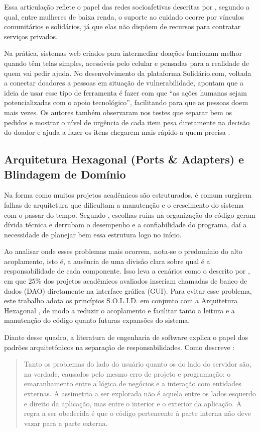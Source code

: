 Essa articulação reflete o papel das redes socioafetivas descritas por \textcite[22]{sousa2025}, segundo a qual, entre mulheres de baixa renda, o suporte ao cuidado ocorre por vínculos comunitários e solidários, já que elas não dispõem de recursos para contratar serviços privados.

Na prática, sistemas web criados para intermediar doações funcionam melhor quando têm telas simples, acessíveis pelo celular e pensadas para a realidade de quem vai pedir ajuda. No desenvolvimento da plataforma Solidário.com, voltada a conectar doadores a pessoas em situação de vulnerabilidade, \textcite[178]{santos2026} apontam que a ideia de usar esse tipo de ferramenta é fazer com que ``as ações humanas sejam potencializadas com o apoio tecnológico'', facilitando para que as pessoas doem mais vezes. Os autores também observaram nos testes que separar bem os pedidos e mostrar o nível de urgência de cada item pesa diretamente na decisão do doador e ajuda a fazer os itens chegarem mais rápido a quem precisa \cite[184, 191]{santos2026}.

\subsection{Arquitetura Hexagonal (Ports \& Adapters) e Blindagem de Domínio}
Na forma como muitos projetos acadêmicos são estruturados, é comum surgirem falhas de arquitetura que dificultam a manutenção e o crescimento do sistema com o passar do tempo. Segundo \textcite{deluca2025}, escolhas ruins na organização do código geram dívida técnica e derrubam o desempenho e a confiabilidade do programa, daí a necessidade de planejar bem essa estrutura logo no início.

Ao analisar onde esses problemas mais ocorrem, nota-se o predomínio do alto acoplamento, isto é, a ausência de uma divisão clara sobre qual é a responsabilidade de cada componente. Isso leva a cenários como o descrito por \textcite[9]{deluca2025}, em que 25\% dos projetos acadêmicos avaliados inseriam chamadas de banco de dados (DAO) diretamente na interface gráfica (GUI). Para evitar esse problema, este trabalho adota os princípios S.O.L.I.D. em conjunto com a Arquitetura Hexagonal \cite{rayarao2026}, de modo a reduzir o acoplamento e facilitar tanto a leitura e a manutenção do código quanto futuras expansões do sistema.

Diante desse quadro, a literatura de engenharia de software explica o papel dos padrões arquitetônicos na separação de responsabilidades. Como descreve \textcite[3, tradução nossa]{cockburn2005}:
\begin{quote}
Tanto os problemas do lado do usuário quanto os do lado do servidor são, na verdade, causados pelo mesmo erro de projeto e programação: o emaranhamento entre a lógica de negócios e a interação com entidades externas. A assimetria a ser explorada não é aquela entre os lados esquerdo e direito da aplicação, mas entre o interior e o exterior da aplicação. A regra a ser obedecida é que o código pertencente à parte interna não deve vazar para a parte externa.
\end{quote}

